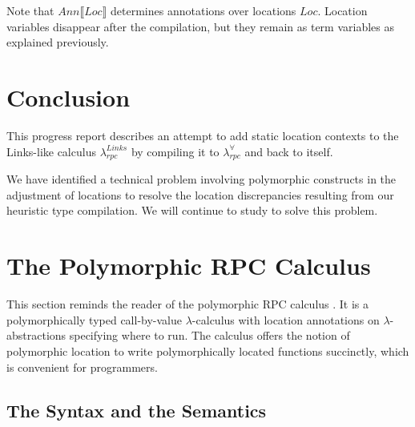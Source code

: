 \documentclass[a4paper]{article}
\theoremstyle{plain}
\theoremstyle{definition}
\newcommand{\polyrpc}{$\lambda_{rpc}^{\forall}$\xspace}
\newcommand{\linksrpc}{$\lambda_{rpc}^{Links}$\xspace}
\newcommand{\anncomp}[1]{Ann\llbracket#1\rrbracket}
\newcommand{\Loc}{Loc}
\begin{document}
%
Note that $\anncomp{\Loc}$ determines annotations over locations
$\Loc$.
%
Location variables disappear after the compilation, but they remain as
term variables as explained previously.

\section{Conclusion}
\label{sec:conclusion}

%
This progress report describes an attempt to add static location
contexts to the Links-like calculus \linksrpc by compiling it to
\polyrpc and back to itself.

%
We have identified a technical problem involving polymorphic
constructs in the adjustment of locations to resolve the location
discrepancies resulting from our heuristic type compilation.
%
We will continue to study to solve this problem. 

	

	
\appendix
	
\section{The Polymorphic RPC Calculus}
\label{app:1}

This section reminds the reader of the polymorphic RPC calculus
\cite{CHOI:scp2020}.
%
It is a polymorphically typed call-by-value $\lambda$-calculus with
location annotations on $\lambda$-abstractions specifying where to
run.
%
The calculus offers the notion of polymorphic location to write
polymorphically located functions succinctly, which is convenient for
programmers.

\subsection{The Syntax and the Semantics}
\label{sec:polyrpc:syntax&semantics}
\end{document}
